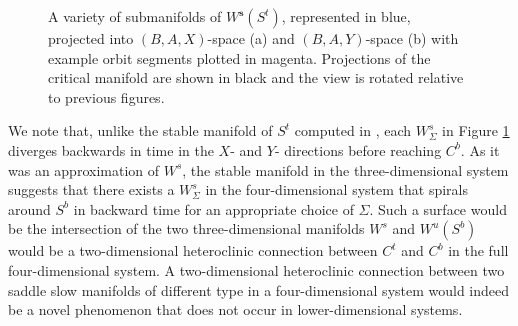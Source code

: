 \documentclass{ws-ijbc}
\begin{document}
\begin{figure}
\centering
{}
\caption{A variety of submanifolds of $W^{\mathbf{s}}(S^t)$, represented in blue, projected into $(B,A,X)$-space (a) and $(B,A,Y)$-space (b) with example orbit segments plotted in magenta.  Projections of the critical manifold are shown in black and the view is rotated relative to previous figures.}
\label{pieces}
\end{figure}
    
We note that, unlike the stable manifold of $S^t$ computed in \cite{QSSA}, each $W^{s}_{\Sigma}$ in Figure \ref{pieces} diverges backwards in time in the $X$- and $Y$- directions before reaching $C^b$.  As it was an approximation of $W^s$, the stable manifold in the three-dimensional system suggests that there exists a $W^{s}_{\Sigma}$ in the four-dimensional system that spirals around $S^b$ in backward time for an appropriate choice of $\Sigma$.  Such a surface would be the intersection of the two three-dimensional manifolds $W^s$ and $W^u(S^b)$ would be a two-dimensional heteroclinic connection between $C^t$ and $C^b$ in the full four-dimensional system.  A two-dimensional heteroclinic connection between two saddle slow manifolds of different type in a four-dimensional system would indeed be a novel phenomenon that does not occur in lower-dimensional systems.
\end{document}

